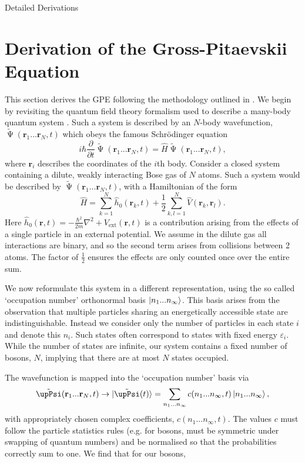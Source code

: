 \begin{chapter}{Detailed Derivations\label{app:App2}}
\section{\label{appsection:gpeqft} Derivation of the Gross-Pitaevskii Equation}
This section derives the GPE following the methodology outlined in \cite{0953-4075-41-20-203002}. We begin by revisiting the quantum field theory formalism used to describe a many-body quantum system \cite{fetter1971quantum}. Such a system is described by an $N$-body wavefunction, $\tilde{\upPsi}(\mathbf{r}_1...\mathbf{r}_N,t)$ which obeys the famous Schr\"odinger equation
\begin{equation}
i \hbar\frac{\partial}{\partial t}\tilde{\upPsi}(\mathbf{r}_1...\mathbf{r}_N,t) = \hat{H}\tilde{\upPsi}(\mathbf{r}_1...\mathbf{r}_N,t),
\label{eq:gpeqftscho}
\end{equation}
where $\mathbf{r}_i$ describes the coordinates of the $i$th body. Consider a closed system containing a dilute, weakly interacting Bose gas of $N$ atoms. Such a system would be described by $\tilde{\upPsi}(\mathbf{r}_1...\mathbf{r}_N,t)$, with a Hamiltonian of the form 
\begin{equation}
\hat{H} = \sum_{k=1}^N\hat{h}_0(\mathbf{r}_k,t) + \frac{1}{2}\sum_{k,l=1}^N \hat{V}(\mathbf{r}_k,\mathbf{r}_l).
\label{eq:gpeqfthamil}
\end{equation}
Here $\hat{h}_0(\mathbf{r},t) = -\frac{\hbar^2}{2m}\nabla^2+V_{\mathrm{ext}}(\mathbf{r},t)$ is a contribution arising from the effects of a single particle in an external potential. We assume in the dilute gas all interactions are binary, and so the second term arises from collisions between 2 atoms. The factor of $\frac{1}{2}$ ensures the effects are only counted once over the entire sum.

We now reformulate this system in a different representation, using the so called `occupation number' orthonormal basis $\ket{n_1...n_\infty}$. This basis arises from the observation that multiple particles sharing an energetically accessible state are indistinguishable. Instead we consider only the number of particles in each state $i$ and denote this $n_i$. Such states often correspond to states with fixed energy $\varepsilon_i$. While the number of states are infinite, our system contains a fixed number of bosons, $N$, implying that there are at most $N$ states occupied.

The wavefunction is mapped into the `occupation number' basis via
\begin{equation*}
\tilde{\upPsi}(\mathbf{r}_1...\mathbf{r}_N,t) \rightarrow \ket{\tilde{\upPsi}(t)}=\sum_{n_1...n_\infty} c(n_1...n_\infty,t)\ket{n_1...n_\infty},
\end{equation*}
with appropriately chosen complex coefficients, $c(n_1...n_\infty,t)$. The values $c$ must follow the particle statistics rules (e.g. for bosons, must be symmetric under swapping of quantum numbers) and be normalised so that the probabilities correctly sum to one. We find that for our bosons,


\end{chapter}

